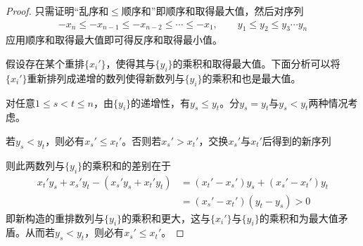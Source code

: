 \begin{proof}
  只需证明“乱序和$\le$顺序和”即顺序和取得最大值，然后对序列
  \begin{align*}
    -x_n\le -x_{n-1} \le -x_{n-2} \le \cdots \le -x_1,\quad\quad
    y_1 \le y_2 \le y_3\cdots y_n
  \end{align*}
  应用顺序和取得最大值即可得反序和取得最小值。



  假设存在某个重排$\{x_i'\}$，使得其与$\{y_i\}$的乘积和取得最大值。下面分析可以将$\{x_i'\}$重新排列成递增的数列使得新数列与$\{y_i\}$的乘积和也是最大值。

  对任意$1\le s < t\le n$，由$\{y_i\}$的递增性，有$y_s\le y_t$。分$y_s=y_t$与$y_s<y_t$两种情况考虑。

  若$y_s<y_t$，则必有$x_s'\le x_t'$。否则若$x_s'>x_t'$，交换$x_s'$与$x_t'$后得到的新序列
  \begin{center}
  \end{center}
  则此两数列与$\{y_i\}$的乘积和的差别在于
  \begin{align*}
    x_t'y_s+x_s'y_t - (x_s'y_s+x_t'y_t)& = (x_t'-x_s')y_s + (x_s'-x_t')y_t\\
                                      & = (x_s'-x_t')(y_t-y_s) > 0
  \end{align*}
  即新构造的重排数列与$\{y_i\}$的乘积和更大，这与$\{x_i'\}$与$\{y_i\}$的乘积和为最大值矛盾。从而若$y_s<y_t$，则必有$x_s'\le x_t'$。


\end{proof}
